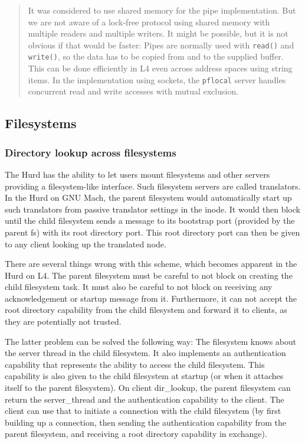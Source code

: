 \documentclass[9pt,a4paper]{extarticle}
\newenvironment{comment}{\footnotesize \begin{quote}}{\end{quote}}
\begin{document}
\begin{comment}
  It was considered to use shared memory for the pipe implementation.
  But we are not aware of a lock-free protocol using shared memory
  with multiple readers and multiple writers.  It might be possible,
  but it is not obvious if that would be faster: Pipes are normally
  used with \texttt{read()} and \texttt{write()}, so the data has to
  be copied from and to the supplied buffer.  This can be done
  efficiently in L4 even across address spaces using string items.  In
  the implementation using sockets, the \texttt{pflocal} server
  handles concurrent read and write accesses with mutual exclusion.
\end{comment}


\subsection{Filesystems}

\subsubsection{Directory lookup across filesystems}
\label{xfslookup}

The Hurd has the ability to let users mount filesystems and other
servers providing a filesystem-like interface.  Such filesystem
servers are called translators.  In the Hurd on GNU Mach, the parent
filesystem would automatically start up such translators from passive
translator settings in the inode.  It would then block until the child
filesystem sends a message to its bootstrap port (provided by the
parent fs) with its root directory port.  This root directory port can
then be given to any client looking up the translated node.

There are several things wrong with this scheme, which becomes
apparent in the Hurd on L4.  The parent filesystem must be careful to
not block on creating the child filesystem task.  It must also be
careful to not block on receiving any acknowledgement or startup
message from it.  Furthermore, it can not accept the root directory
capability from the child filesystem and forward it to clients, as
they are potentially not trusted.

The latter problem can be solved the following way: The filesystem
knows about the server thread in the child filesystem.  It also
implements an authentication capability that represents the ability to
access the child filesystem.  This capability is also given to the
child filesystem at startup (or when it attaches itself to the parent
filesystem).  On client dir\_lookup, the parent filesystem can return
the server\_thread and the authentication capability to the client.
The client can use that to initiate a connection with the child
filesystem (by first building up a connection, then sending the
authentication capability from the parent filesystem, and receiving a
root directory capability in exchange).
\end{document}
